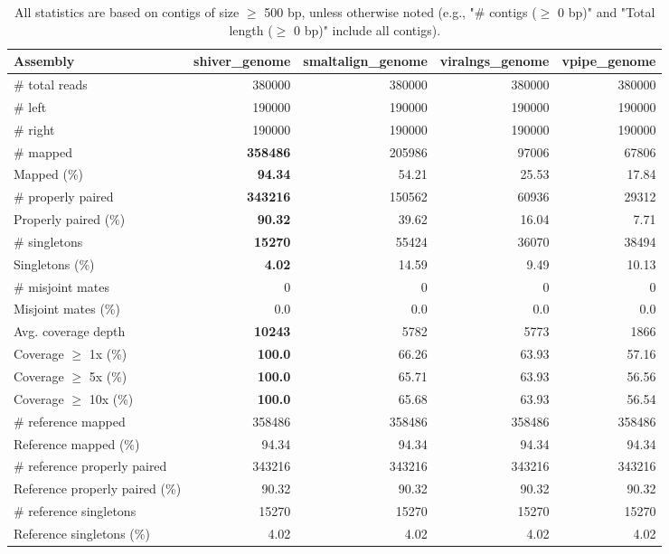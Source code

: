\documentclass[12pt,a4paper]{article}
\begin{document}
\begin{table}[ht]
\begin{center}
\caption{All statistics are based on contigs of size $\geq$ 500 bp, unless otherwise noted (e.g., "\# contigs ($\geq$ 0 bp)" and "Total length ($\geq$ 0 bp)" include all contigs).}
\begin{tabular}{|l*{4}{|r}|}
\hline
Assembly & shiver\_genome & smaltalign\_genome & viralngs\_genome & vpipe\_genome \\ \hline
\# total reads & 380000 & 380000 & 380000 & 380000 \\ \hline
\# left & 190000 & 190000 & 190000 & 190000 \\ \hline
\# right & 190000 & 190000 & 190000 & 190000 \\ \hline
\# mapped & {\bf 358486} & 205986 & 97006 & 67806 \\ \hline
Mapped (\%) & {\bf 94.34} & 54.21 & 25.53 & 17.84 \\ \hline
\# properly paired & {\bf 343216} & 150562 & 60936 & 29312 \\ \hline
Properly paired (\%) & {\bf 90.32} & 39.62 & 16.04 & 7.71 \\ \hline
\# singletons & {\bf 15270} & 55424 & 36070 & 38494 \\ \hline
Singletons (\%) & {\bf 4.02} & 14.59 & 9.49 & 10.13 \\ \hline
\# misjoint mates & 0 & 0 & 0 & 0 \\ \hline
Misjoint mates (\%) & 0.0 & 0.0 & 0.0 & 0.0 \\ \hline
Avg. coverage depth & {\bf 10243} & 5782 & 5773 & 1866 \\ \hline
Coverage $\geq$ 1x (\%) & {\bf 100.0} & 66.26 & 63.93 & 57.16 \\ \hline
Coverage $\geq$ 5x (\%) & {\bf 100.0} & 65.71 & 63.93 & 56.56 \\ \hline
Coverage $\geq$ 10x (\%) & {\bf 100.0} & 65.68 & 63.93 & 56.54 \\ \hline
\# reference mapped & 358486 & 358486 & 358486 & 358486 \\ \hline
Reference mapped (\%) & 94.34 & 94.34 & 94.34 & 94.34 \\ \hline
\# reference properly paired & 343216 & 343216 & 343216 & 343216 \\ \hline
Reference properly paired (\%) & 90.32 & 90.32 & 90.32 & 90.32 \\ \hline
\# reference singletons & 15270 & 15270 & 15270 & 15270 \\ \hline
Reference singletons (\%) & 4.02 & 4.02 & 4.02 & 4.02 \\ \hline

\end{tabular}
\end{center}
\end{table}
\end{document}
